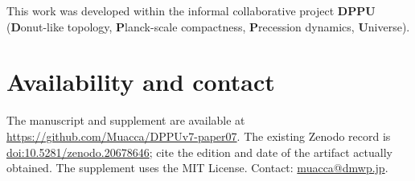 \documentclass[11pt,a4paper]{article}
\begin{document}
This work was developed within the informal collaborative project \textbf{DPPU} (\textbf{D}onut-like topology, \textbf{P}lanck-scale compactness, \textbf{P}recession dynamics, \textbf{U}niverse).
\section*{Availability and contact}
The manuscript and supplement are available at \url{https://github.com/Muacca/DPPUv7-paper07}. The existing Zenodo record is \href{https://doi.org/10.5281/zenodo.20678646}{doi:10.5281/zenodo.20678646}; cite the edition and date of the artifact actually obtained. The supplement uses the MIT License. Contact: \href{mailto:muacca@dmwp.jp}{muacca@dmwp.jp}.

\appendix









\end{document}
